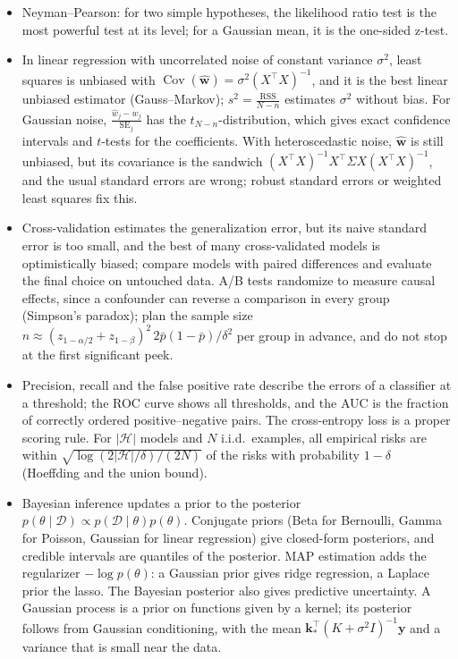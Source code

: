 \documentclass[11pt]{article}
\DeclareMathOperator{\Cov}{Cov}
\theoremstyle{definition}
\theoremstyle{plain}
\theoremstyle{remark}
\begin{document}
\begin{itemize}[leftmargin=*]
    \item Neyman--Pearson: for two simple hypotheses, the likelihood ratio test is the most powerful test at its level; for a Gaussian mean, it is the one-sided z-test.
    \item In linear regression with uncorrelated noise of constant variance $\sigma^2$, least squares is unbiased with $\Cov(\hat{\mathbf{w}}) = \sigma^2(X^\top X)^{-1}$, and it is the best linear unbiased estimator (Gauss--Markov); $s^2 = \frac{\mathrm{RSS}}{N - n}$ estimates $\sigma^2$ without bias. For Gaussian noise, $\frac{\hat w_j - w_j}{\mathrm{SE}_j}$ has the $t_{N-n}$-distribution, which gives exact confidence intervals and $t$-tests for the coefficients. With heteroscedastic noise, $\hat{\mathbf{w}}$ is still unbiased, but its covariance is the sandwich $(X^\top X)^{-1}X^\top\Sigma X(X^\top X)^{-1}$, and the usual standard errors are wrong; robust standard errors or weighted least squares fix this.
    \item Cross-validation estimates the generalization error, but its naive standard error is too small, and the best of many cross-validated models is optimistically biased; compare models with paired differences and evaluate the final choice on untouched data. A/B tests randomize to measure causal effects, since a confounder can reverse a comparison in every group (Simpson's paradox); plan the sample size $n \approx (z_{1-\alpha/2} + z_{1-\beta})^2\,2\bar p(1 - \bar p)/\delta^2$ per group in advance, and do not stop at the first significant peek.
    \item Precision, recall and the false positive rate describe the errors of a classifier at a threshold; the ROC curve shows all thresholds, and the AUC is the fraction of correctly ordered positive--negative pairs. The cross-entropy loss is a proper scoring rule. For $|\mathcal{H}|$ models and $N$ i.i.d.\ examples, all empirical risks are within $\sqrt{\log(2|\mathcal{H}|/\delta)/(2N)}$ of the risks with probability $1 - \delta$ (Hoeffding and the union bound).
    \item Bayesian inference updates a prior to the posterior $p(\theta \mid \mathcal{D}) \propto p(\mathcal{D} \mid \theta)p(\theta)$. Conjugate priors (Beta for Bernoulli, Gamma for Poisson, Gaussian for linear regression) give closed-form posteriors, and credible intervals are quantiles of the posterior. MAP estimation adds the regularizer $-\log p(\theta)$: a Gaussian prior gives ridge regression, a Laplace prior the lasso. The Bayesian posterior also gives predictive uncertainty. A Gaussian process is a prior on functions given by a kernel; its posterior follows from Gaussian conditioning, with the mean $\mathbf{k}_*^\top(K + \sigma^2I)^{-1}\mathbf{y}$ and a variance that is small near the data.

\end{itemize}
\end{document}
